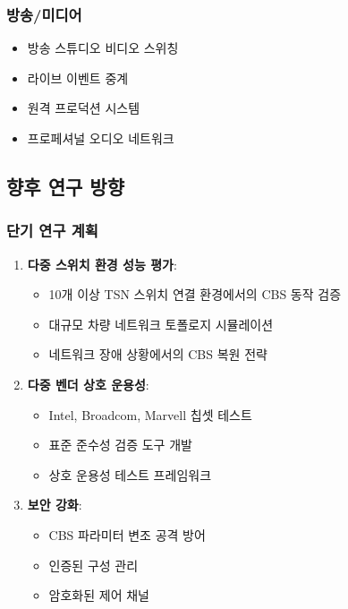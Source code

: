 \documentclass[twocolumn,10pt]{article}
\begin{document}
\subsubsection{방송/미디어}

\begin{itemize}
    \item 방송 스튜디오 비디오 스위칭
    \item 라이브 이벤트 중계
    \item 원격 프로덕션 시스템
    \item 프로페셔널 오디오 네트워크
\end{itemize}

\subsection{향후 연구 방향}

\subsubsection{단기 연구 계획}

\begin{enumerate}
    \item \textbf{다중 스위치 환경 성능 평가}: 
        \begin{itemize}
            \item 10개 이상 TSN 스위치 연결 환경에서의 CBS 동작 검증
            \item 대규모 차량 네트워크 토폴로지 시뮬레이션
            \item 네트워크 장애 상황에서의 CBS 복원 전략
        \end{itemize}
    
    \item \textbf{다중 벤더 상호 운용성}:
        \begin{itemize}
            \item Intel, Broadcom, Marvell 칩셋 테스트
            \item 표준 준수성 검증 도구 개발
            \item 상호 운용성 테스트 프레임워크
        \end{itemize}
    
    \item \textbf{보안 강화}:
        \begin{itemize}
            \item CBS 파라미터 변조 공격 방어
            \item 인증된 구성 관리
            \item 암호화된 제어 채널
        \end{itemize}
\end{enumerate}
\end{document}
